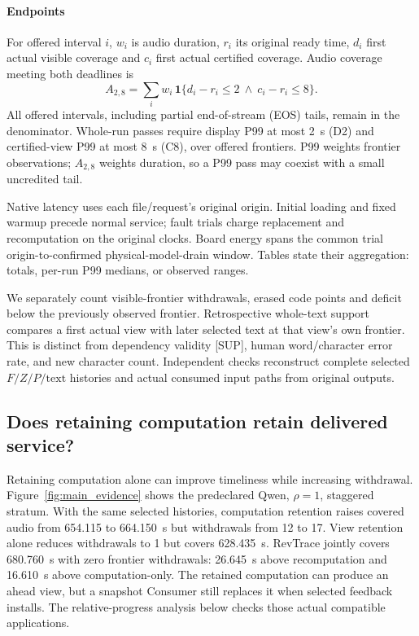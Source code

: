 \paragraph{Endpoints}
For offered interval $i$, $w_i$ is audio duration, $r_i$ its original
ready time, $d_i$ first actual visible coverage and $c_i$ first actual
certified coverage. Audio coverage meeting both deadlines is
\begin{equation}
 A_{2,8}=\sum_i w_i\,\mathbf{1}
 \{d_i-r_i\leq2\ \land\ c_i-r_i\leq8\}.
 \label{eq:credit}
\end{equation}
All offered intervals, including partial end-of-stream (EOS) tails,
remain in the denominator. Whole-run passes require display P99 at most
2~s (D2) and certified-view P99 at most 8~s (C8), over offered frontiers.
P99 weights frontier observations; $A_{2,8}$ weights duration, so a P99
pass may coexist with a small uncredited tail.

Native latency uses each file/request's original origin. Initial loading
and fixed warmup precede normal service; fault trials charge replacement
and recomputation on the original clocks. Board energy spans the common trial origin-to-confirmed
physical-model-drain window. Tables state their aggregation: totals,
per-run P99 medians, or observed ranges.

We separately count visible-frontier withdrawals, erased code points and
deficit below the previously observed frontier. Retrospective whole-text
support compares a first actual view with later selected text at that
view's own frontier. This is distinct from dependency validity [SUP],
human word/character error rate, and new character count. Independent
checks reconstruct complete selected $F/Z/P/\mathrm{text}$ histories and
actual consumed input paths from original outputs.

\subsection{Does retaining computation retain delivered service?}
Retaining computation alone can improve timeliness while increasing
withdrawal. Figure~\ref{fig:main_evidence} shows the predeclared Qwen,
$\rho=1$, staggered stratum. With the same selected histories, computation
retention raises covered audio from 654.115 to 664.150~s but withdrawals
from 12 to 17. View retention alone reduces withdrawals to 1 but covers
628.435~s. RevTrace jointly covers 680.760~s with zero frontier withdrawals:
26.645~s above recomputation and 16.610~s above computation-only.
The retained computation can produce an ahead view, but a snapshot
Consumer still replaces it when selected feedback installs. The
relative-progress analysis below checks those actual compatible
applications.


